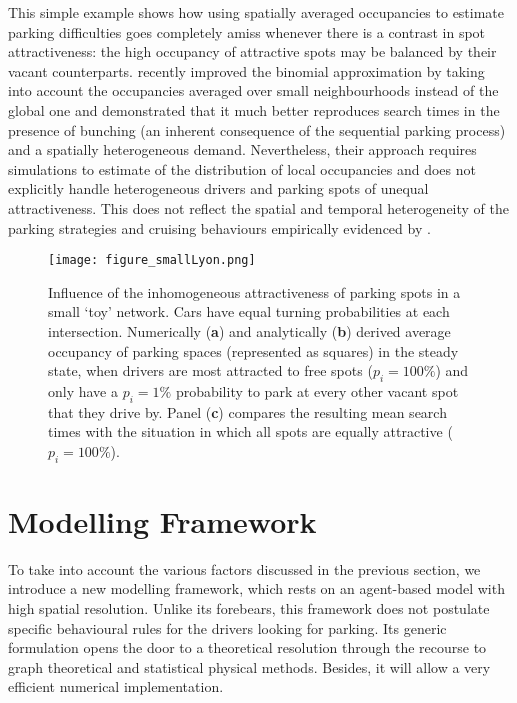 \documentclass[trsc,reprint]{informs3}
\newcommand{\AN}[1]{#1}
\begin{document}
This simple example shows how using spatially averaged occupancies to estimate parking difficulties goes completely amiss whenever there is a contrast in spot attractiveness: \AN{the} high occupancy of attractive spots
may be balanced by their vacant counterparts. 
\citet{fulman2021approximation} recently improved the binomial approximation by taking into account the occupancies averaged over
small neighbourhoods instead of the global one and demonstrated that it much better reproduces search times in the presence of bunching (an inherent consequence of the sequential parking process) and a spatially heterogeneous demand. Nevertheless, their approach 
requires simulations to estimate of the distribution of local occupancies and does not explicitly handle heterogeneous drivers and parking spots of unequal attractiveness. 
\AN{This does not reflect the spatial and temporal heterogeneity of the parking strategies and cruising behaviours empirically evidenced
by \citet{assemi2020searching}.}



\begin{figure}[!htb]
    \centering
        \texttt{[image: figure\_smallLyon.png]}
  
 \caption{Influence of the inhomogeneous attractiveness of parking spots in a small `toy' network. Cars have equal turning probabilities at each intersection. Numerically (\textbf{a}) and analytically (\textbf{b}) derived average occupancy of parking spaces (represented as squares) in the steady state, when drivers are most attracted to free spots ($p_i=100\%$) and only have a $p_i=1\%$ probability to park at every other vacant spot that they drive by. Panel (\textbf{c}) compares the resulting mean search times with the situation in which all spots are equally attractive ($p_i=100\%$). }
\label{fig:smallLyon}
\end{figure}


 
 
\section{Modelling Framework} 

To take into account the various factors discussed in the previous section, we introduce
a new modelling framework, which rests on an agent-based model with high spatial resolution.
Unlike its forebears, this framework does not postulate specific behavioural rules for the 
drivers looking for parking. Its generic formulation opens the door to a theoretical resolution through the recourse to graph theoretical and statistical physical methods. Besides, it will allow a very efficient numerical implementation.
\end{document}
